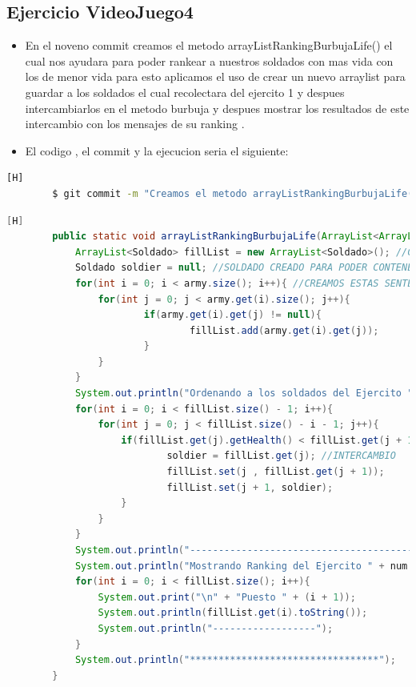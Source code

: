 \documentclass{article}
\begin{document}
	\subsection{Ejercicio VideoJuego4}
	\begin{itemize}	
		\item En el noveno commit creamos el metodo arrayListRankingBurbujaLife() el cual nos ayudara para poder rankear a nuestros soldados con mas vida con los de menor vida para esto aplicamos el uso de crear un nuevo arraylist para guardar a los soldados el cual recolectara del ejercito 1 y despues intercambiarlos en el metodo burbuja y despues mostrar los resultados de este intercambio con los mensajes de su ranking .
		\item El codigo , el commit y la ejecucion seria el siguiente:
	\end{itemize}	
	\begin{lstlisting}[language=bash,caption={Commit}][H]
		$ git commit -m "Creamos el metodo arrayListRankingBurbujaLife() el cual nos ayudara para poder rankear a nuestros soldados con mas vida con los de menor vida para esto aplicamos el uso de crear un nuevo arraylist para guardar a los soldados el cual recolectara del ejercito 1 y despues intercambiarlos en el metodo burbuja y despues mostrar los resultados de este intercambio con los mensajes de su ranking"
	\end{lstlisting}	
	\begin{lstlisting}[language=java,caption={Las lineas de codigos del metodo creado:}][H]
		public static void arrayListRankingBurbujaLife(ArrayList<ArrayList<Soldado>> army, int num){
			ArrayList<Soldado> fillList = new ArrayList<Soldado>(); //CREAMOS ESTE ARRAYLIST PARA PODER GUARDAR A LOS SOLDADOS EN UN SOLO ARRAYLIST EL CUAL SEA EFECTIVO EL METODO BURBUJA 
			Soldado soldier = null; //SOLDADO CREADO PARA PODER CONTENER EL INTERCAMBIO ENTRE SOLDADOS EN EL METODO BURBUJA
			for(int i = 0; i < army.size(); i++){ //CREAMOS ESTAS SENTENCIAS PARA PODER VERIFICAR EL NUMERO DE SOLDADOS PARA DESPUES PONER EL RANKING DE PUESTOS DE CADA UNO DE ESTOS SOLDADOS
				for(int j = 0; j < army.get(i).size(); j++){
						if(army.get(i).get(j) != null){
								fillList.add(army.get(i).get(j));
						}
				}
			}
			System.out.println("Ordenando a los soldados del Ejercito " + num + " por el metodo burbuja: "); //APLICAMOS EL METODO BURBUJA CON LOS PUNTOS DE VIDA
			for(int i = 0; i < fillList.size() - 1; i++){
				for(int j = 0; j < fillList.size() - i - 1; j++){
					if(fillList.get(j).getHealth() < fillList.get(j + 1).getHealth()){
							soldier = fillList.get(j); //INTERCAMBIO
							fillList.set(j , fillList.get(j + 1));
							fillList.set(j + 1, soldier);
					}
				}      
			}
			System.out.println("------------------------------------------");
			System.out.println("Mostrando Ranking del Ejercito " + num + " ..... ////// --->"); //MOSTRADOR DE RANKING DE LOS SOLDADOS
			for(int i = 0; i < fillList.size(); i++){
				System.out.print("\n" + "Puesto " + (i + 1));
				System.out.println(fillList.get(i).toString());
				System.out.println("------------------");
			}
			System.out.println("*********************************");
	   	}
	\end{lstlisting}
\end{document}
